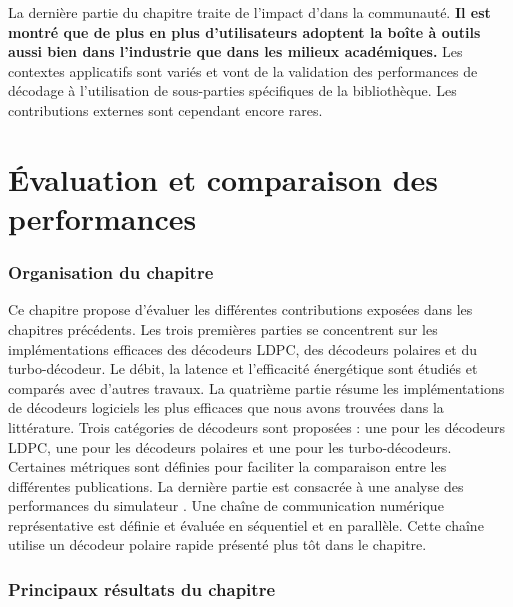 La dernière partie du chapitre traite de l'impact d'\AFFECT dans la communauté.
\textbf{Il est montré que de plus en plus d'utilisateurs adoptent la boîte à
outils \AFFECT aussi bien dans l'industrie que dans les milieux académiques.}
Les contextes applicatifs sont variés et vont de la validation des performances
de décodage à l'utilisation de sous-parties spécifiques de la bibliothèque. Les
contributions externes sont cependant encore rares.

\section*{Évaluation et comparaison des performances}

\subsubsection*{Organisation du chapitre}

Ce chapitre propose d'évaluer les différentes contributions exposées dans les
chapitres précédents. Les trois premières parties se concentrent sur les
implémentations efficaces des décodeurs LDPC, des décodeurs polaires et du
turbo-décodeur. Le débit, la latence et l'efficacité énergétique sont étudiés
et comparés avec d'autres travaux. La quatrième partie résume les
implémentations de décodeurs logiciels les plus efficaces que nous avons
trouvées dans la littérature. Trois catégories de décodeurs sont proposées : une
pour les décodeurs LDPC, une pour les décodeurs polaires et une pour les
turbo-décodeurs. Certaines métriques sont définies pour faciliter la comparaison
entre les différentes publications. La dernière partie est consacrée à une
analyse des performances du simulateur \AFFECT. Une chaîne de communication
numérique représentative est définie et évaluée en séquentiel et en parallèle.
Cette chaîne utilise un décodeur polaire rapide présenté plus tôt dans le
chapitre.

\subsubsection*{Principaux résultats du chapitre}

